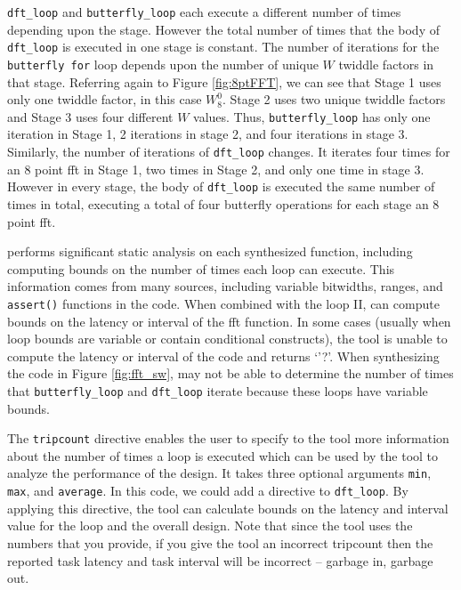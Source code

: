 \lstinline|dft_loop| and \lstinline|butterfly_loop| each execute a different number of times depending upon the stage. However the total number of times that the body of \lstinline|dft_loop| is executed in one stage is constant. The number of iterations for the \lstinline|butterfly for| loop depends upon the number of unique $W$ twiddle factors in that stage. Referring again to Figure \ref{fig:8ptFFT}, we can see that Stage 1 uses only one twiddle factor, in this case $W_8^0$. Stage 2 uses two unique twiddle factors and Stage 3 uses four different $W$ values. Thus, \lstinline|butterfly_loop| has only one iteration in Stage 1, 2 iterations in stage 2, and four iterations in stage 3. Similarly, the number of iterations of \lstinline|dft_loop| changes. It iterates four times for an 8 point \gls{fft} in Stage 1, two times in Stage 2, and only one time in stage 3. However in every stage, the body of \lstinline|dft_loop| is executed the same number of times in total, executing a total of four butterfly operations for each stage an 8 point \gls{fft}. 

\begin{aside}
\VHLS performs significant static analysis on each synthesized function, including computing bounds on the number of times each loop can execute.  This information comes from many sources, including variable bitwidths, ranges, and \lstinline|assert()| functions in the code. When combined with the loop II, \VHLS can compute bounds on the latency or interval of the \gls{fft} function.  In some cases (usually when loop bounds are variable or contain conditional constructs), the tool is unable to compute the latency or interval of the code and returns `'?'.  When synthesizing the code in Figure \ref{fig:fft_sw}, \VHLS may not be able to determine the number of times that \lstinline|butterfly_loop| and \lstinline|dft_loop| iterate because these loops have variable bounds.

The \lstinline|tripcount| directive enables the user to specify to the \VHLS tool more information about the number of times a loop is executed which can be used by the tool to analyze the performance of the design. It takes three optional arguments \lstinline|min|, \lstinline|max|, and \lstinline|average|. In this code, we could add a directive to \lstinline|dft_loop|. By applying this directive, the \VHLS tool can calculate bounds on the latency and interval value for the loop and the overall design.  Note that since the \VHLS tool uses the numbers that you provide, if you give the tool an incorrect tripcount then the reported task latency and task interval will be incorrect -- garbage in, garbage out.   
\end{aside}

